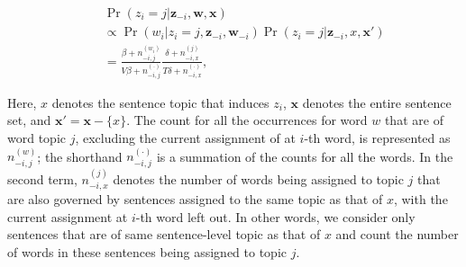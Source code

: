 \begin{small}
\begin{eqnarray*}
  && \Pr(z_i = j|\mathbf{z}_{-i}, \mathbf{w}, \mathbf{x}) \nonumber\\
  && \propto \Pr(w_i|z_i = j, \mathbf{z}_{-i}, \mathbf{w}_{-i}) \Pr(z_i = j|\mathbf{z}_{-i}, x, \mathbf{x}') \nonumber \\
  && = \frac{\beta + n_{-i,j}^{(w_i)}}{V \beta + n_{-i,j}^{(\cdot)}} \frac{\delta + n_{-i,x}^{(j)}}{T \delta + n_{-i,x}^{(\cdot)}}, \label{z_i:2.3}
\end{eqnarray*}\end{small}

Here, $x$ denotes the sentence topic that induces $z_i$, $\mathbf{x}$ denotes
the entire sentence set, and $\mathbf{x}' = \mathbf{x} - \{ x \}$.  The count
{for} all the occurrences for word $w$ that are of word topic $j$, excluding
the current assignment of at $i$-th word, is represented as $n_{-i,j}^{(w)}$;
the shorthand $n_{-i,j}^{(\cdot)}$ is a summation of the counts for all the
words.  In the second term, $n_{-i,x}^{(j)}$ denotes the number of words being
assigned to topic $j$ that are also governed by sentences assigned to the same
topic as that of $x$, with the current assignment at $i$-th word left out.  In
other words, we consider only sentences that are of same sentence-level topic
as that of $x$ and count the number of words in these sentences being assigned
to topic $j$.  


